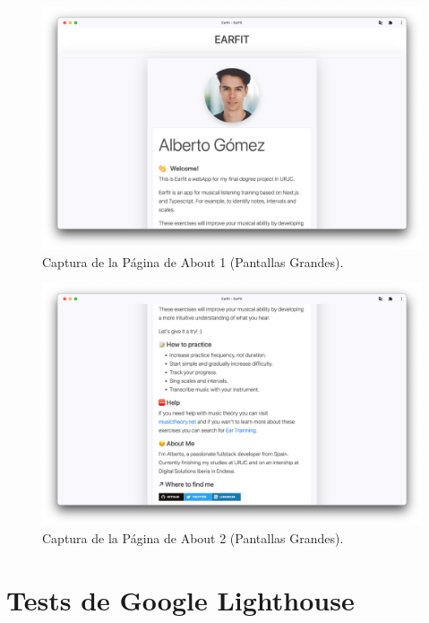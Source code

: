 \documentclass[12pt,twoside,titlepage]{report}
\begin{document}
\begin{figure}[H]
    \centering
    \includegraphics[scale=0.28]{Capturas Earfit/PC/About1}
    \caption{Captura de la Página de About 1 (Pantallas Grandes).}
    \label{fig:PCAbout1}
\end{figure}

\begin{figure}[H]
    \centering
    \includegraphics[scale=0.28]{Capturas Earfit/PC/About2}
    \caption{Captura de la Página de About 2 (Pantallas Grandes).}
    \label{fig:PCAbout2}
\end{figure}

\chapter{Tests de Google Lighthouse}
\label{sec:lighthousetest}
\end{document}
